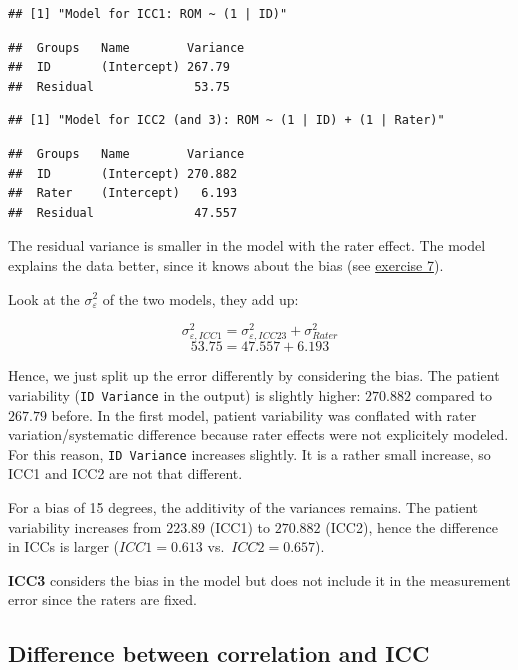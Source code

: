 \documentclass[
]{book}
\begin{document}
\begin{verbatim}
## [1] "Model for ICC1: ROM ~ (1 | ID)"
\end{verbatim}

\begin{verbatim}
##  Groups   Name        Variance
##  ID       (Intercept) 267.79  
##  Residual              53.75
\end{verbatim}

\begin{verbatim}
## [1] "Model for ICC2 (and 3): ROM ~ (1 | ID) + (1 | Rater)"
\end{verbatim}

\begin{verbatim}
##  Groups   Name        Variance
##  ID       (Intercept) 270.882 
##  Rater    (Intercept)   6.193 
##  Residual              47.557
\end{verbatim}

The residual variance is smaller in the model with the rater effect.
The model explains the data better, since it knows about the bias (see \hyperref[excercise7]{exercise 7}).

Look at the \(\sigma_{\varepsilon}^2\) of the two models, they add up:

\[\sigma_{\varepsilon, ICC1}^2 = \sigma_{\varepsilon, ICC23}^2 + \sigma_{Rater}^2\]
\[53.75 = 47.557 + 6.193\]

Hence, we just split up the error differently by considering the bias.
The patient variability (\texttt{ID\ Variance} in the output) is slightly higher:
\(270.882\) compared to \(267.79\) before.
In the first model, patient variability was conflated with rater variation/systematic difference
because rater effects were not explicitely modeled. For this reason,
\texttt{ID\ Variance} increases slightly.
It is a rather small increase, so ICC1 and ICC2 are not that different.

For a bias of 15 degrees, the additivity of the variances remains.
The patient variability increases from \(223.89\) (ICC1) to \(270.882\) (ICC2),
hence the difference in ICCs is larger (\(ICC1=0.613\) vs.~\(ICC2=0.657\)).

\textbf{ICC3} considers the bias in the model but does not include it in the measurement
error since the raters are fixed.

\subsection{Difference between correlation and ICC}\label{difference-between-correlation-and-icc}
\end{document}

